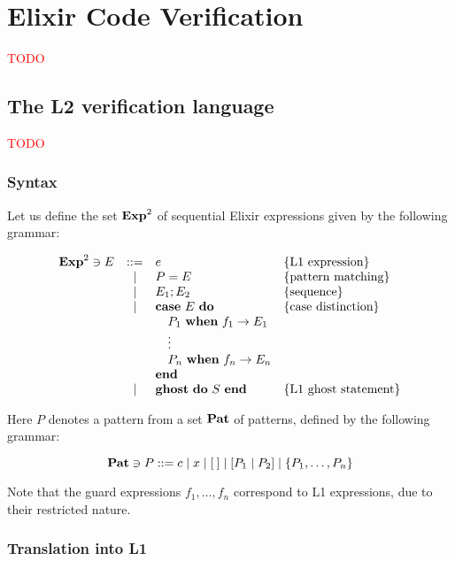 \chapter{Elixir Code Verification}
\label{cap:elixirCodeVerification}


\textcolor{red}{TODO}

\section{The L2 verification language}

\textcolor{red}{TODO}

\subsection{Syntax}

Let us define the set $\mathbf{Exp}^{2}$ of sequential Elixir expressions given by the 
following grammar:

\[
\begin{array}{rcll}
\mathbf{Exp}^{2} \ni E & ::= & e & \{ \textrm{L1 expression} \} \\
& | & P = E & \{ \textrm{pattern matching} \} \\
& | & E_1; E_2 & \{ \textrm{sequence} \} \\
& | & \textbf{case}~E~\textbf{do} & \{ \textrm{case distinction} \} \\
& & \quad P_1~\textbf{when}~f_1 \rightarrow E_1 \\
& & \quad \vdots\\
& & \quad P_n~\textbf{when}~f_n \rightarrow E_n \\
& & \textbf{end} \\
& | & \textbf{ghost}~\textbf{do}~S~\textbf{end} & \{ \textrm{L1 ghost statement} \} \\
\end{array}
\]

Here $P$ denotes a pattern from a set $\mathbf{Pat}$ of patterns, defined by the 
following grammar:

\[
\mathbf{Pat} \ni P ::= c \mid x \mid [\:] \mid [P_1 \mid P_2] \mid \{ P_1, \ldots, P_n \}
\]

Note that the guard expressions $f_1, \ldots, f_n$ correspond to L1 expressions,
due to their restricted nature.

\subsection{Translation into L1}

